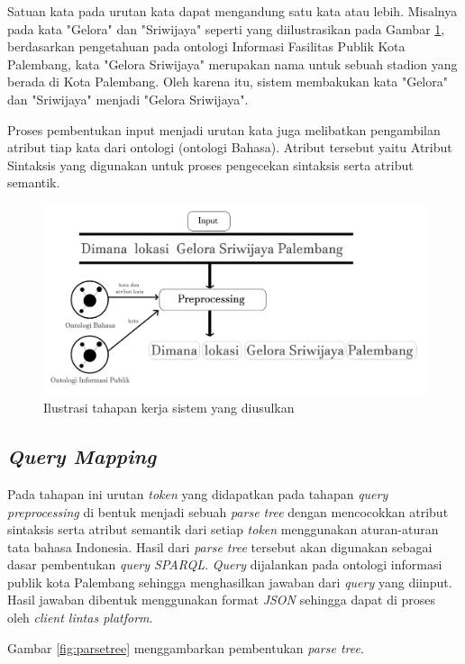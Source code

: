 	Satuan kata pada urutan kata dapat mengandung satu kata atau lebih. Misalnya pada kata "Gelora" dan "Sriwijaya" seperti yang diilustrasikan pada Gambar \ref{fig:querypreprocessing}, berdasarkan pengetahuan pada ontologi Informasi Fasilitas Publik Kota Palembang, kata "Gelora Sriwijaya" merupakan nama untuk sebuah stadion yang berada di Kota Palembang. Oleh karena itu, sistem membakukan kata "Gelora" dan "Sriwijaya" menjadi "Gelora Sriwijaya".
	
	Proses pembentukan input menjadi urutan kata juga melibatkan pengambilan atribut tiap kata dari ontologi (ontologi Bahasa). Atribut tersebut yaitu Atribut Sintaksis yang digunakan untuk proses pengecekan sintaksis serta atribut semantik. 
	
	\begin{figure}[H]
		\centering
		\includegraphics[scale=0.50]{gambar/querypreprocessing.png}
		\caption{Ilustrasi tahapan kerja sistem yang diusulkan}
		\label{fig:querypreprocessing}
	\end{figure}
	
	\subsection{\emph{Query Mapping}}
	Pada tahapan ini urutan \emph{token} yang didapatkan pada tahapan \emph{query preprocessing} di bentuk menjadi sebuah \emph{parse tree} dengan mencocokkan atribut sintaksis serta atribut semantik dari setiap \emph{token} menggunakan aturan-aturan tata bahasa Indonesia. Hasil dari \emph{parse tree} tersebut akan digunakan sebagai dasar pembentukan \emph{query SPARQL}. \emph{Query} dijalankan pada ontologi informasi publik kota Palembang sehingga menghasilkan jawaban dari \emph{query} yang diinput. Hasil jawaban dibentuk menggunakan format \emph{JSON} sehingga dapat di proses oleh \emph{client lintas platform}.
	
	Gambar \ref{fig:parsetree} menggambarkan pembentukan \emph{parse tree}.
	
